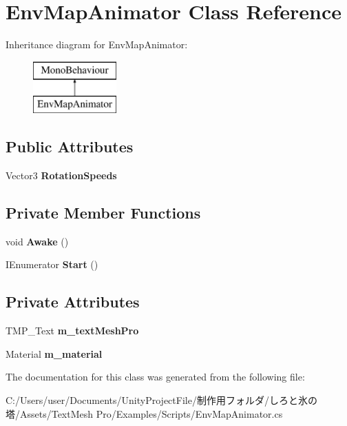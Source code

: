 \hypertarget{class_env_map_animator}{}\section{Env\+Map\+Animator Class Reference}
\label{class_env_map_animator}
Inheritance diagram for Env\+Map\+Animator\+:\begin{figure}[H]
\begin{center}
\leavevmode
\includegraphics[height=2.000000cm]{class_env_map_animator}
\end{center}
\end{figure}
\subsection*{Public Attributes}
\begin{DoxyCompactItemize}
\item 
\mbox{\label{class_env_map_animator_a0e8af1e7df113e4ca34b2ffbb6a603e7}} 
Vector3 {\bfseries Rotation\+Speeds}
\end{DoxyCompactItemize}
\subsection*{Private Member Functions}
\begin{DoxyCompactItemize}
\item 
\mbox{\label{class_env_map_animator_ab068eb4d4818991266673eec54fc015a}} 
void {\bfseries Awake} ()
\item 
\mbox{\label{class_env_map_animator_adbe7951dff130857ba9b73a293873cd5}} 
I\+Enumerator {\bfseries Start} ()
\end{DoxyCompactItemize}
\subsection*{Private Attributes}
\begin{DoxyCompactItemize}
\item 
\mbox{\label{class_env_map_animator_ab5eb85d6b2d2cd0c16dc89a97bdcd7f3}} 
T\+M\+P\+\_\+\+Text {\bfseries m\+\_\+text\+Mesh\+Pro}
\item 
\mbox{\label{class_env_map_animator_adba0e59d88f38e597f293b8ee9cd22e3}} 
Material {\bfseries m\+\_\+material}
\end{DoxyCompactItemize}


The documentation for this class was generated from the following file\+:\begin{DoxyCompactItemize}
\item 
C\+:/\+Users/user/\+Documents/\+Unity\+Project\+File/制作用フォルダ/しろと氷の塔/\+Assets/\+Text\+Mesh Pro/\+Examples/\+Scripts/Env\+Map\+Animator.\+cs\end{DoxyCompactItemize}
